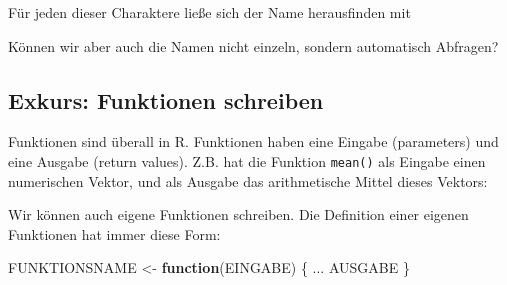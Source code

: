 \documentclass[
  ngerman,
]{article}
\newenvironment{Shaded}{\begin{snugshade}}{\end{snugshade}}
\newcommand{\CommentTok}[1]{\textcolor[rgb]{0.56,0.35,0.01}{\textit{#1}}}
\newcommand{\ControlFlowTok}[1]{\textcolor[rgb]{0.13,0.29,0.53}{\textbf{#1}}}
\newcommand{\DocumentationTok}[1]{\textcolor[rgb]{0.56,0.35,0.01}{\textbf{\textit{#1}}}}
\newcommand{\FunctionTok}[1]{\textcolor[rgb]{0.00,0.00,0.00}{#1}}
\newcommand{\NormalTok}[1]{#1}
\newcommand{\OtherTok}[1]{\textcolor[rgb]{0.56,0.35,0.01}{#1}}
\newcommand{\SpecialCharTok}[1]{\textcolor[rgb]{0.00,0.00,0.00}{#1}}
\newcommand{\StringTok}[1]{\textcolor[rgb]{0.31,0.60,0.02}{#1}}
\begin{document}
Für jeden dieser Charaktere ließe sich der Name herausfinden mit

\begin{Shaded}
\end{Shaded}

Können wir aber auch die Namen nicht einzeln, sondern automatisch Abfragen?

\hypertarget{exkurs-funktionen-schreiben}{%
\subsection{Exkurs: Funktionen schreiben}\label{exkurs-funktionen-schreiben}}

Funktionen sind überall in R. Funktionen haben eine Eingabe (parameters) und eine Ausgabe (return values). Z.B. hat die Funktion \texttt{mean()} als Eingabe einen numerischen Vektor, und als Ausgabe das arithmetische Mittel dieses Vektors:

\begin{Shaded}
\end{Shaded}

Wir können auch eigene Funktionen schreiben. Die Definition einer eigenen Funktionen hat immer diese Form:

\begin{Shaded}
\begin{Highlighting}[]
\NormalTok{FUNKTIONSNAME }\OtherTok{\textless{}{-}} \ControlFlowTok{function}\NormalTok{(EINGABE) \{}
\NormalTok{  ...}
\NormalTok{  AUSGABE}
\NormalTok{\}}
\end{Highlighting}
\end{Shaded}
\end{document}
